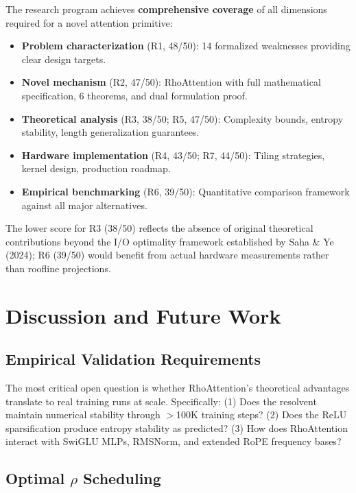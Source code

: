 \documentclass[11pt,a4paper]{article}
\theoremstyle{remark}
\begin{document}
The research program achieves \textbf{comprehensive coverage} of all dimensions required for a novel attention primitive:
\begin{itemize}
    \item \textbf{Problem characterization} (R1, 48/50): 14 formalized weaknesses providing clear design targets.
    \item \textbf{Novel mechanism} (R2, 47/50): RhoAttention with full mathematical specification, 6 theorems, and dual formulation proof.
    \item \textbf{Theoretical analysis} (R3, 38/50; R5, 47/50): Complexity bounds, entropy stability, length generalization guarantees.
    \item \textbf{Hardware implementation} (R4, 43/50; R7, 44/50): Tiling strategies, kernel design, production roadmap.
    \item \textbf{Empirical benchmarking} (R6, 39/50): Quantitative comparison framework against all major alternatives.
\end{itemize}

The lower score for R3 (38/50) reflects the absence of original theoretical contributions beyond the I/O optimality framework established by Saha \& Ye (2024); R6 (39/50) would benefit from actual hardware measurements rather than roofline projections.

\section{Discussion and Future Work}

\subsection{Empirical Validation Requirements}

The most critical open question is whether RhoAttention's theoretical advantages translate to real training runs at scale. Specifically: (1) Does the resolvent maintain numerical stability through $>$100K training steps? (2) Does the ReLU sparsification produce entropy stability as predicted? (3) How does RhoAttention interact with SwiGLU MLPs, RMSNorm, and extended RoPE frequency bases?

\subsection{Optimal $\rho$ Scheduling}
\end{document}
